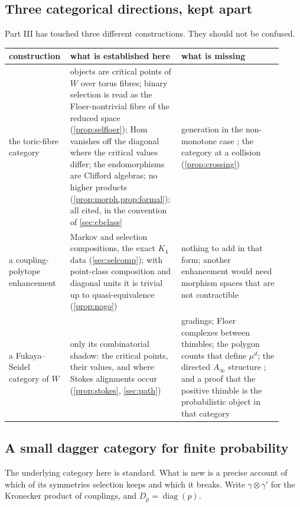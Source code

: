 \documentclass[11pt]{article}
\theoremstyle{definition}\newtheorem{definition}[theorem]{Definition}\newtheorem{remark}[theorem]{Remark}\newtheorem{example}[theorem]{Example}\newtheorem{problem}[theorem]{Open problem}\crefname{problem}{Problem}{Problems}
\begin{document}
\subsection{Three categorical directions, kept apart}\label{sec:threecat}
Part III has touched three different constructions. They should not be confused.
\begin{center}\small
\begin{tabular}{p{0.2\linewidth}p{0.36\linewidth}p{0.36\linewidth}}\toprule
construction & what is established here & what is missing\\\midrule
the toric-fibre category & objects are critical points of $W$ over torus fibres; binary selection is read as the Floer-nontrivial fibre of the reduced space (\cref{prop:selfloer}); Hom vanishes off the diagonal where the critical values differ; the endomorphisms are Clifford algebras; no higher
products (\cref{prop:morph,prop:formal}); all cited, in the convention of \cref{sec:cbclass} & generation in the non-monotone case \cite{Smith2018}; the category at a collision (\cref{prop:crossing}) \\
a coupling-polytope enhancement & Markov and selection compositions, the exact $K_4$ data (\cref{sec:selcomp}); with point-class composition and diagonal units it is trivial up to quasi-equivalence
(\cref{prop:nogo}) & nothing to add in that form; another enhancement would need morphism spaces that are not contractible \\
a Fukaya--Seidel category of $W$ & only its combinatorial shadow: the critical points, their values, and where Stokes alignments occur (\cref{prop:stokes}, \cref{sec:path}) & gradings; Floer complexes
between thimbles; the polygon counts that define $\mu^d$; the directed $A_\infty$ structure \cite{Seidel2008}; and a proof that the positive thimble is the probabilistic object in that category\\\bottomrule
\end{tabular}
\end{center}

\subsection{A small dagger category for finite probability}\label{sec:probcat}
The underlying category here is standard. What is new is a precise account of which of its symmetries selection keeps and which it breaks. Write
$\gamma\otimes\gamma'$ for the Kronecker product of couplings, and $D_p=\operatorname{diag}(p)$.
\end{document}
